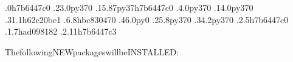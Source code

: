 \documentclass[a4paper,11pt,english]{sphinxmanual}
\begin{document}
\begin{sphinxVerbatim}[commandchars=\\\{\}]
\PYGZhy{}.0h7b6447c\PYGZus{}0
\PYGZhy{}.23.0py37\PYGZus{}0
\PYGZhy{}.15.87py37h7b6447c\PYGZus{}0
\PYGZhy{}.4.0py37\PYGZus{}0
\PYGZhy{}.14.0py37\PYGZus{}0
\PYGZhy{}.31.1h62c20be\PYGZus{}1
\PYGZhy{}.6.8hbc83047\PYGZus{}0
\PYGZhy{}.46.0py\PYGZus{}0
\PYGZhy{}.25.8py37\PYGZus{}0
\PYGZhy{}.34.2py37\PYGZus{}0
\PYGZhy{}.2.5h7b6447c\PYGZus{}0
\PYGZhy{}.1.7had09818\PYGZus{}2
\PYGZhy{}.2.11h7b6447c\PYGZus{}3


ThefollowingNEWpackageswillbeINSTALLED:


\end{sphinxVerbatim}
\end{document}

